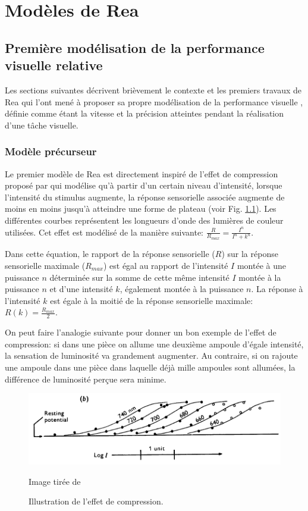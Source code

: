 \chapter{Modèles de Rea}
	\section{Première modélisation de la performance visuelle relative}
	\par Les sections suivantes décrivent brièvement le contexte et les premiers travaux de Rea qui l'ont mené à proposer sa propre modélisation de la performance visuelle \citep{rea_toward_1986, rea_toward_1987}, définie comme étant la vitesse et la précision atteintes pendant la réalisation d'une tâche visuelle.
	
	\subsection{Modèle précurseur}	
	\par Le premier modèle de Rea est directement inspiré de l'effet de compression proposé par \cite{naka_attempt_1966} qui modélise qu'à partir d'un certain niveau d'intensité, lorsque l'intensité du stimulus augmente, la réponse sensorielle associée augmente de moins en moins jusqu'à atteindre une forme de plateau (voir Fig. \ref{fig:compression_effect}). Les différentes courbes représentent les longueurs d'onde des lumières de couleur utilisées. Cet effet est modélisé de la manière suivante: $\frac{R}{R_{max}} = \frac{I^n}{I^n + k^n}$.
	
	\par Dans cette équation, le rapport de la réponse sensorielle ($R$) sur la réponse sensorielle maximale ($R_{max}$) est égal au rapport de l'intensité $I$ montée à une puissance $n$ déterminée sur la somme de cette même intensité $I$ montée à la puissance $n$ et d'une intensité $k$, également montée à la puissance $n$. La réponse à l'intensité $k$ est égale à la moitié de la réponse sensorielle maximale: $R(k) = \frac{R_{max}}{2}$.
	
	\par On peut faire l'analogie suivante pour donner un bon exemple de l'effet de compression: si dans une pièce on allume une deuxième ampoule d'égale intensité, la sensation de luminosité va grandement augmenter. Au contraire, si on rajoute une ampoule dans une pièce dans laquelle déjà mille ampoules sont allumées, la différence de luminosité perçue sera minime.	
	
	\begin{figure}[h]
		\centering
		\includegraphics[scale=.6]{Figures/CompressionEffect}
		\caption{Illustration de l'effet de compression.}{Image tirée de \citep{naka_attempt_1966}}
		\label{fig:compression_effect}
	\end{figure} 
	
